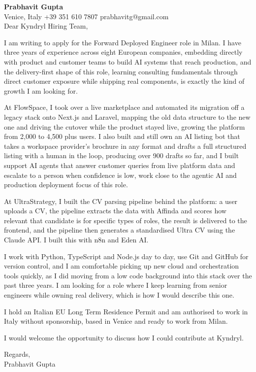 \documentclass[a4paper,10.5pt]{article}
\begin{document}
\textbf{Prabhavit Gupta}\\
Venice, Italy \textbar{} +39 351 610 7807 \textbar{} prabhavitg@gmail.com\\[10pt]
Dear Kyndryl Hiring Team,

I am writing to apply for the Forward Deployed Engineer role in Milan. I have three years of experience across eight European companies, embedding directly with product and customer teams to build AI systems that reach production, and the delivery-first shape of this role, learning consulting fundamentals through direct customer exposure while shipping real components, is exactly the kind of growth I am looking for.

At FlowSpace, I took over a live marketplace and automated its migration off a legacy stack onto Next.js and Laravel, mapping the old data structure to the new one and driving the cutover while the product stayed live, growing the platform from 2,000 to 4,500 plus users. I also built and still own an AI listing bot that takes a workspace provider's brochure in any format and drafts a full structured listing with a human in the loop, producing over 900 drafts so far, and I built support AI agents that answer customer queries from live platform data and escalate to a person when confidence is low, work close to the agentic AI and production deployment focus of this role.

At UltraStrategy, I built the CV parsing pipeline behind the platform: a user uploads a CV, the pipeline extracts the data with Affinda and scores how relevant that candidate is for specific types of roles, the result is delivered to the frontend, and the pipeline then generates a standardised Ultra CV using the Claude API. I built this with n8n and Eden AI.

I work with Python, TypeScript and Node.js day to day, use Git and GitHub for version control, and I am comfortable picking up new cloud and orchestration tools quickly, as I did moving from a low code background into this stack over the past three years. I am looking for a role where I keep learning from senior engineers while owning real delivery, which is how I would describe this one.

I hold an Italian EU Long Term Residence Permit and am authorised to work in Italy without sponsorship, based in Venice and ready to work from Milan.

I would welcome the opportunity to discuss how I could contribute at Kyndryl.

Regards,\\
Prabhavit Gupta
\end{document}
